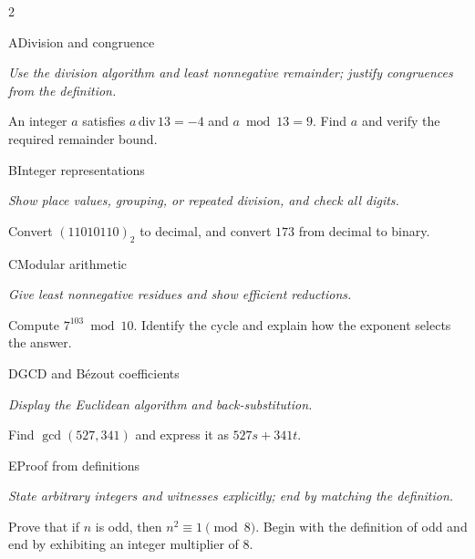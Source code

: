 \documentclass[9pt]{extarticle}
\begin{document}
\begin{multicols}{2}
\begin{CoreProblem}{A}{Division and congruence}
{\scriptsize\textit{Use the division algorithm and least nonnegative remainder; justify congruences from the definition.}\par}
An integer $a$ satisfies $a\,\mathrm{div}\,13=-4$ and $a\bmod13=9$.
Find $a$ and verify the required remainder bound.
\end{CoreProblem}
\begin{CoreProblem}{B}{Integer representations}
{\scriptsize\textit{Show place values, grouping, or repeated division, and check all digits.}\par}
Convert $(11010110)_2$ to decimal, and convert $173$ from decimal to binary.
\end{CoreProblem}
\begin{CoreProblem}{C}{Modular arithmetic}
{\scriptsize\textit{Give least nonnegative residues and show efficient reductions.}\par}
Compute $7^{103}\bmod10$. Identify the cycle and explain how the exponent
selects the answer.
\end{CoreProblem}
\columnbreak
\begin{CoreProblem}{D}{GCD and B\'ezout coefficients}
{\scriptsize\textit{Display the Euclidean algorithm and back-substitution.}\par}
Find $\gcd(527,341)$ and express it as $527s+341t$.
\end{CoreProblem}
\begin{CoreProblem}{E}{Proof from definitions}
{\scriptsize\textit{State arbitrary integers and witnesses explicitly; end by matching the definition.}\par}
Prove that if $n$ is odd, then $n^2\equiv1\pmod{8}$. Begin with the definition
of odd and end by exhibiting an integer multiplier of $8$.
\end{CoreProblem}
\end{multicols}
\CoreWorkArea
\FormBreak
{}
\end{document}
